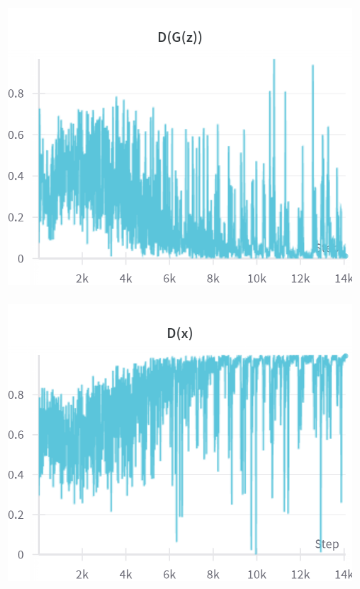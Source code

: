 \begin{figure}[H]
    \begin{subfigure}{0.45\textwidth}
        \centering
        \includegraphics[width=0.95\linewidth]{cDCGAN/D_G_z.png}
        \caption{}
        \label{subfig:cDCGAN/D_G_z}
    \end{subfigure}%
    \begin{subfigure}{0.45\textwidth}
        \centering
        \includegraphics[width=0.95\linewidth]{cDCGAN/D_x.png}
        \caption{}
        \label{subfig:cDCGAN/D_x}
    \end{subfigure}


\end{figure}
